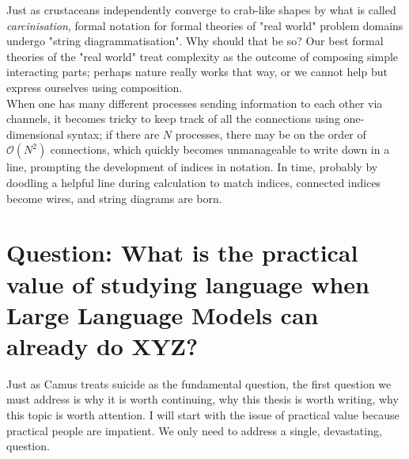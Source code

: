 Just as crustaceans independently converge to crab-like shapes by what is called \emph{carcinisation}, formal notation for formal theories of "real world" problem domains undergo "string diagrammatisation". Why should that be so? Our best formal theories of the "real world" treat complexity as the outcome of composing simple interacting parts; perhaps nature really works that way, or we cannot help but express ourselves using composition.\\

When one has many different processes sending information to each other via channels, it becomes tricky to keep track of all the connections using one-dimensional syntax; if there are $N$ processes, there may be on the order of $\mathcal{O}(N^2)$ connections, which quickly becomes unmanageable to write down in a line, prompting the development of indices in notation. In time, probably by doodling a helpful line during calculation to match indices, connected indices become wires, and string diagrams are born.

\section{\textbf{Question:} What is the practical value of studying language when Large Language Models can already do XYZ?}

Just as Camus treats suicide as the fundamental question, the first question we must address is why it is worth continuing, why this thesis is worth writing, why this topic is worth attention. I will start with the issue of practical value because practical people are impatient. We only need to address a single, devastating, question.\\

